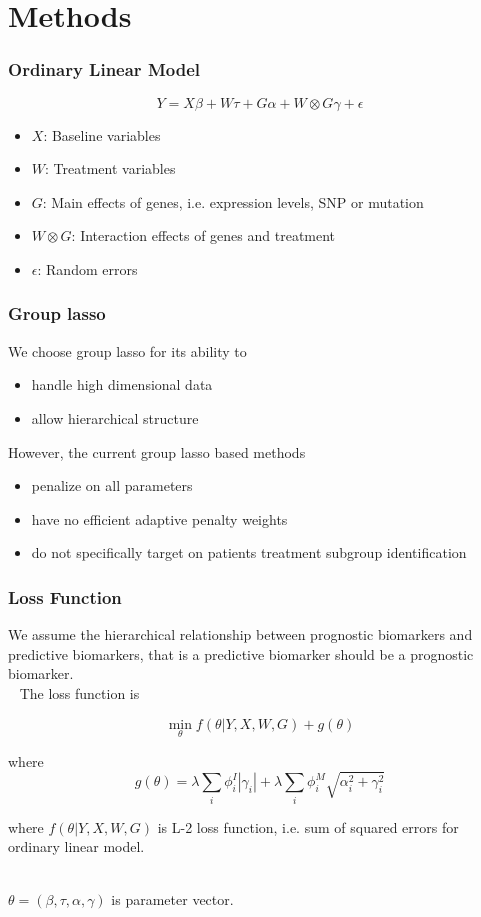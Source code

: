 \documentclass{beamer}
\begin{document}
\section{Methods}

\begin{frame}
\frametitle{Ordinary Linear Model}

$$Y=X\beta + W\tau + G\alpha + W\otimes G \gamma+\epsilon$$

\begin{itemize}
    \item $X$: Baseline variables
    \item $W$: Treatment variables
    \item $G$: Main effects of genes, i.e. expression levels, SNP or mutation
    \item $W\otimes G$: Interaction effects of genes and treatment
    \item $\epsilon$: Random errors
\end{itemize}
\end{frame}

\begin{frame}
\frametitle{Group lasso}

We choose group lasso for its ability to 

\begin{itemize}
    \item handle high dimensional data
    \item allow hierarchical structure
\end{itemize}

However, the current group lasso based methods

\begin{itemize}
    \item penalize on all parameters
    \item have no efficient adaptive penalty weights
    \item do not specifically target on patients treatment subgroup identification
\end{itemize}

\end{frame}

\begin{frame}
\frametitle{Loss Function}

We assume the hierarchical relationship between prognostic biomarkers and predictive biomarkers, 
that is a predictive biomarker should be a prognostic biomarker.\\~
The loss function is

$$\min_{\theta} f(\theta|Y,X,W,G)+ g(\theta)$$

 where $$ g(\theta)=\lambda \sum_i \phi_i^I |\gamma_i| + \lambda \sum_i \phi_i^M \sqrt{\alpha_i^2 + \gamma_i^2}$$

where $f(\theta|Y,X,W,G)$ is L-2 loss function, i.e. sum of squared errors for ordinary linear model.\\~

$\theta=(\beta, \tau, \alpha, \gamma)$ is parameter vector.



\end{frame}
\end{document}
